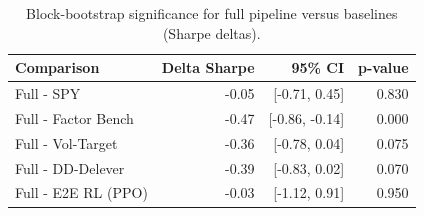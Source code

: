 \begin{table}[H]
\centering
\caption{Block-bootstrap significance for full pipeline versus baselines (Sharpe deltas).}
\label{tab:bootstrap_significance}
\begin{tabular}{@{} l r r r @{}}
\toprule
Comparison & Delta Sharpe & 95\% CI & p-value \\
\midrule
Full - SPY & -0.05 & [-0.71, 0.45] & 0.830 \\
Full - Factor Bench & -0.47 & [-0.86, -0.14] & 0.000 \\
Full - Vol-Target & -0.36 & [-0.78, 0.04] & 0.075 \\
Full - DD-Delever & -0.39 & [-0.83, 0.02] & 0.070 \\
Full - E2E RL (PPO) & -0.03 & [-1.12, 0.91] & 0.950 \\
\bottomrule
\end{tabular}
\end{table}
